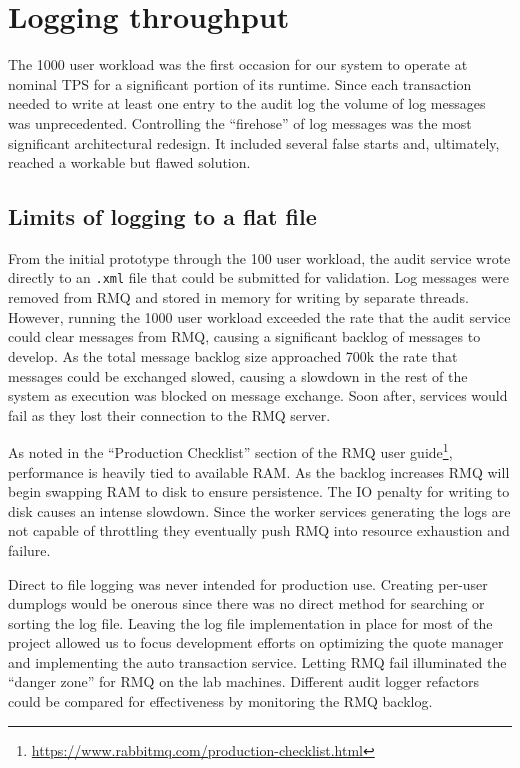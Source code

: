 \section{Logging throughput}
The 1000 user workload was the first occasion for our system to operate at nominal TPS for a significant portion of its runtime.
Since each transaction needed to write at least one entry to the audit log the volume of log messages was unprecedented.
Controlling the ``firehose'' of log messages was the most significant architectural redesign.
It included several false starts and, ultimately, reached a workable but flawed solution.

\subsection{Limits of logging to a flat file}
From the initial prototype through the 100 user workload, the audit service wrote directly to an \texttt{.xml} file that could be submitted for validation.
Log messages were removed from RMQ and stored in memory for writing by separate threads.
However, running the 1000 user workload exceeded the rate that the audit service could clear messages from RMQ, causing a significant backlog of messages to develop.
As the total message backlog size approached 700k the rate that messages could be exchanged slowed, causing a slowdown in the rest of the system as execution was blocked on message exchange.
Soon after, services would fail as they lost their connection to the RMQ server.

As noted in the ``Production Checklist'' section of the RMQ user guide\footnote{\url{https://www.rabbitmq.com/production-checklist.html}}, performance is heavily tied to available RAM.
As the backlog increases RMQ will begin swapping RAM to disk to ensure persistence.
The IO penalty for writing to disk causes an intense slowdown.
Since the worker services generating the logs are not capable of throttling they eventually push RMQ into resource exhaustion and failure.

Direct to file logging was never intended for production use.
Creating per-user dumplogs would be onerous since there was no direct method for searching or sorting the log file.
Leaving the log file implementation in place for most of the project allowed us to focus development efforts on optimizing the quote manager and implementing the auto transaction service.
Letting RMQ fail illuminated the ``danger zone'' for RMQ on the lab machines.
Different audit logger refactors could be compared for effectiveness by monitoring the RMQ backlog.

